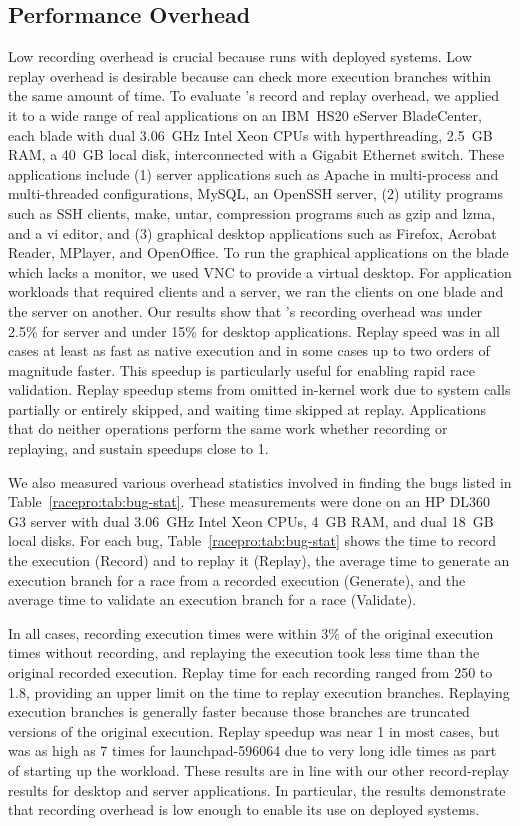 \subsection{Performance Overhead} 

Low recording overhead is crucial
because \racepro runs with deployed systems.  Low replay overhead is desirable
because \racepro can check more execution branches within the same amount of
time.  To evaluate \racepro's record and replay overhead, we
applied it to a wide range of real applications on an IBM~HS20 eServer
BladeCenter, each blade with dual 3.06~GHz Intel Xeon CPUs with
hyperthreading, 2.5~GB RAM, a 40~GB local disk, interconnected with a
Gigabit Ethernet switch.  
These applications include (1) server applications such as Apache
in multi-process and multi-threaded configurations, MySQL, an
OpenSSH server, (2) utility programs such as SSH clients, make, untar,
compression programs such as gzip and lzma, and a vi editor, and (3)
graphical desktop applications such as Firefox, Acrobat Reader,
MPlayer, and OpenOffice.  To run the graphical applications on the
blade which lacks a monitor, we used VNC to provide a virtual desktop. 
For application workloads that required clients
and a server, we ran the clients on one blade and the server on another.
Our results show
that \racepro's recording overhead was under 2.5\% for server and under 15\% for
desktop applications.  Replay speed was in all cases at least as fast as
native execution and in some cases up to two orders of magnitude faster.
This speedup is particularly useful for enabling rapid race validation.
Replay speedup stems from omitted in-kernel work due to system calls
partially or entirely skipped, and waiting time skipped at replay.
Applications that do neither operations perform the same work
whether recording or replaying, and sustain speedups close to 1.

We also measured various overhead statistics involved in finding the
bugs listed in Table~\ref{racepro:tab:bug-stat}.  These measurements were done
on an HP DL360 G3 server with dual 3.06~GHz Intel Xeon CPUs, 4~GB RAM,
and dual 18~GB local disks.  For
each bug, Table~\ref{racepro:tab:bug-stat} shows the time to record the
execution (Record) and to 
replay it (Replay), the average time to generate an execution branch
for a race from a recorded execution (Generate), and the average time
to validate an execution branch for a race (Validate).

In all cases, recording execution times were within 3\% of the original
execution times without recording, and replaying the execution
took less time than the original recorded execution.  Replay time for
each recording ranged from 250\ms{} to 1.8\secs{}, providing an upper
limit on the time to replay execution branches.  Replaying execution
branches is generally faster because those branches are truncated
versions of the original execution.  Replay speedup was near 1 in most
cases, but was as high as 7 times for launchpad-596064 due to very
long idle times as part of starting up the workload.
These results are in line with our other record-replay results for
desktop and server applications.  In particular, the results
demonstrate that \racepro recording overhead is low enough to enable its
use on deployed systems. 

